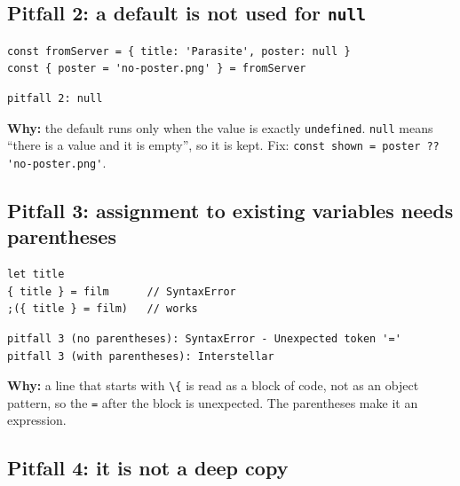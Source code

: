 \documentclass[
]{article}
\newcommand{\passthrough}[1]{#1}
\begin{document}
\hypertarget{pitfall-2-a-default-is-not-used-for-null}{%
\subsection{\texorpdfstring{Pitfall 2: a default is not used for
\texttt{null}}{Pitfall 2: a default is not used for null}}\label{pitfall-2-a-default-is-not-used-for-null}}

\begin{lstlisting}
const fromServer = { title: 'Parasite', poster: null }
const { poster = 'no-poster.png' } = fromServer
\end{lstlisting}

\begin{lstlisting}
pitfall 2: null
\end{lstlisting}

\textbf{Why:} the default runs only when the value is exactly
\passthrough{\lstinline!undefined!}. \passthrough{\lstinline!null!}
means ``there is a value and it is empty'', so it is kept. Fix:
\passthrough{\lstinline!const shown = poster ?? 'no-poster.png'!}.

\hypertarget{pitfall-3-assignment-to-existing-variables-needs-parentheses}{%
\subsection{Pitfall 3: assignment to existing variables needs
parentheses}\label{pitfall-3-assignment-to-existing-variables-needs-parentheses}}

\begin{lstlisting}
let title
{ title } = film      // SyntaxError
;({ title } = film)   // works
\end{lstlisting}

\begin{lstlisting}
pitfall 3 (no parentheses): SyntaxError - Unexpected token '='
pitfall 3 (with parentheses): Interstellar
\end{lstlisting}

\textbf{Why:} a line that starts with \passthrough{\lstinline!\{!} is
read as a block of code, not as an object pattern, so the
\passthrough{\lstinline!=!} after the block is unexpected. The
parentheses make it an expression.

\hypertarget{pitfall-4-it-is-not-a-deep-copy}{%
\subsection{Pitfall 4: it is not a deep
copy}\label{pitfall-4-it-is-not-a-deep-copy}}
\end{document}
